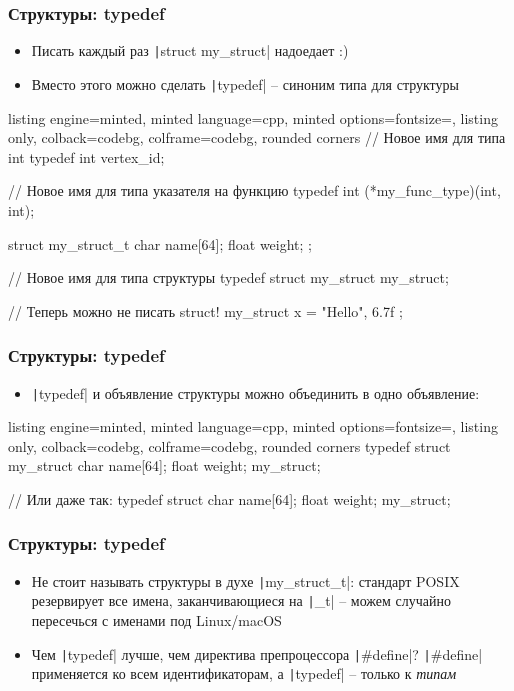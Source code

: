 \documentclass[10pt]{beamer}
\begin{document}
\begin{frame}[fragile]
\frametitle{Структуры: typedef}
\begin{itemize}
\item Писать каждый раз \texttt|struct my_struct| надоедает :)
\pause
\item Вместо этого можно сделать \texttt|typedef| -- синоним типа для структуры
\end{itemize}
\begin{tcblisting}{listing engine=minted, minted language=cpp, minted options={fontsize=\scriptsize}, listing only, colback=codebg, colframe=codebg, rounded corners}
// Новое имя для типа int
typedef int vertex_id;

// Новое имя для типа указателя на функцию
typedef int (*my_func_type)(int, int);

struct my_struct_t {
  char name[64];
  float weight;
};

// Новое имя для типа структуры
typedef struct my_struct my_struct;

// Теперь можно не писать struct!
my_struct x = { "Hello", 6.7f };
\end{tcblisting}
\end{frame}

\begin{frame}[fragile]
\frametitle{Структуры: typedef}
\begin{itemize}
\item \texttt|typedef| и объявление структуры можно объединить в одно объявление:
\end{itemize}
\begin{tcblisting}{listing engine=minted, minted language=cpp, minted options={fontsize=\scriptsize}, listing only, colback=codebg, colframe=codebg, rounded corners}
typedef struct my_struct {
  char name[64];
  float weight;
} my_struct;

// Или даже так:
typedef struct {
  char name[64];
  float weight;
} my_struct;
\end{tcblisting}
\end{frame}

\begin{frame}[fragile]
\frametitle{Структуры: typedef}
\begin{itemize}
\item Не стоит называть структуры в духе \texttt|my_struct_t|: стандарт POSIX резервирует все имена, заканчивающиеся на \texttt|_t| -- можем случайно пересечься с именами под Linux/macOS
\pause
\item Чем \texttt|typedef| лучше, чем директива препроцессора \texttt|#define|? \pause \texttt|#define| применяется ко всем идентификаторам, а \texttt|typedef| -- только к \textit{типам}
\end{itemize}
\end{frame}
\end{document}
